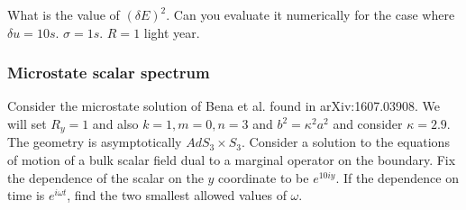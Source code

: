 What is the value of $(\delta E)^2$. Can you evaluate it numerically for the case where $\delta u = 10s$. $\sigma = 1s$. $R = 1$ light year. 


\subsubsection{Microstate scalar spectrum}
\label{problem:microstate-scalar-spectrum}
Consider the microstate solution of Bena et al. found in arXiv:1607.03908. We will set $R_y = 1$ and also $k = 1, m = 0, n= 3$ and $b^2 = \kappa^2 a^2$ and consider $\kappa = 2.9$. The geometry is asymptotically $AdS_3 \times S_3$. 
Consider a solution to the equations of motion of a bulk scalar field dual to a marginal operator on the boundary. Fix the dependence of the scalar on the $y$ coordinate to be $e^{10 i y}$. If the dependence on time is $e^{i \omega t}$, find the two smallest allowed values of $\omega$.


\endgroup

